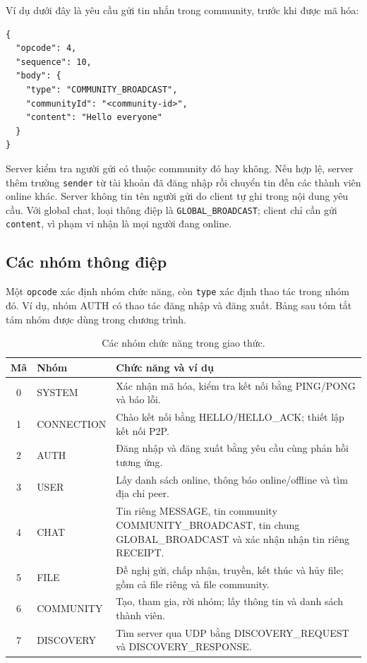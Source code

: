 Ví dụ dưới đây là yêu cầu gửi tin nhắn trong community, trước khi được mã hóa:
\noindent\begin{minipage}{\linewidth}
\begin{lstlisting}[upquote=true,columns=fullflexible,keepspaces=true]
{
  "opcode": 4,
  "sequence": 10,
  "body": {
    "type": "COMMUNITY_BROADCAST",
    "communityId": "<community-id>",
    "content": "Hello everyone"
  }
}
\end{lstlisting}
\end{minipage}

Server kiểm tra người gửi có thuộc community đó hay không. Nếu hợp lệ, server
thêm trường \texttt{sender} từ tài khoản đã đăng nhập rồi chuyển tin đến các
thành viên online khác. Server không tin tên người gửi do client tự ghi trong
nội dung yêu cầu. Với global chat, loại thông điệp là \texttt{GLOBAL\_BROADCAST};
client chỉ cần gửi \texttt{content}, vì phạm vi nhận là mọi người đang online.

\subsection{Các nhóm thông điệp}

Một \texttt{opcode} xác định nhóm chức năng, còn \texttt{type} xác định thao tác
trong nhóm đó. Ví dụ, nhóm AUTH có thao tác đăng nhập và đăng xuất.
Bảng sau tóm tắt tám nhóm được dùng trong chương trình.

\begin{table}[H]
\centering\small
\begin{tabularx}{\linewidth}{c l >{\raggedright\arraybackslash}X}
\toprule
Mã & Nhóm & Chức năng và ví dụ \\
\midrule
0 & SYSTEM & Xác nhận mã hóa, kiểm tra kết nối bằng PING/PONG và báo lỗi. \\
1 & CONNECTION & Chào kết nối bằng HELLO/HELLO\_ACK; thiết lập kết nối P2P. \\
2 & AUTH & Đăng nhập và đăng xuất bằng yêu cầu cùng phản hồi tương ứng. \\
3 & USER & Lấy danh sách online, thông báo online/offline và tìm địa chỉ peer. \\
4 & CHAT & Tin riêng MESSAGE, tin community COMMUNITY\_BROADCAST, tin chung GLOBAL\_BROADCAST và xác nhận nhận tin riêng RECEIPT. \\
5 & FILE & Đề nghị gửi, chấp nhận, truyền, kết thúc và hủy file; gồm cả file riêng và file community. \\
6 & COMMUNITY & Tạo, tham gia, rời nhóm; lấy thông tin và danh sách thành viên. \\
7 & DISCOVERY & Tìm server qua UDP bằng DISCOVERY\_REQUEST và DISCOVERY\_RESPONSE. \\
\bottomrule
\end{tabularx}
\caption{Các nhóm chức năng trong giao thức.}
\end{table}

